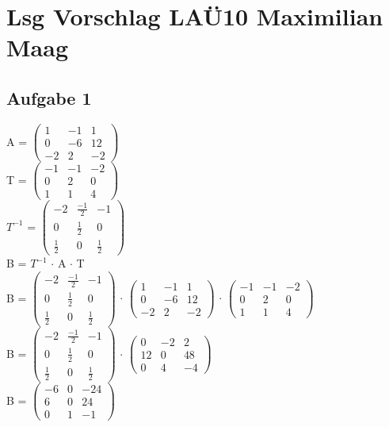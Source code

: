 \documentclass{article}
\begin{document}
	\section*{Lsg Vorschlag LAÜ10 Maximilian Maag}
	\subsection*{Aufgabe 1}
	A = 
	$\left(
	\begin{array}{ccc}
	 1&-1&1 \\ 0&-6&12 \\ -2&2&-2
	\end{array}
	\right)$ \\
	T = 
	$\left(
	\begin{array}{ccc}
	 -1&-1&-2 \\ 0&2&0 \\ 1&1&4
	\end{array}
	\right)$ \\
	$T^{-1}$ =
	$
	\left(\begin{array}{ccc}
	-2 & \frac{-1}{2} & -1 \\
	0 & \frac{1}{2} & 0 \\
	\frac{1}{2} & 0 & \frac{1}{2}
	\end{array}\right)
	$ \\
	B = $T^{-1}$ $\cdot$ A $\cdot$ T \\
	B = 
	$
	\left(\begin{array}{ccc}
	-2 & \frac{-1}{2} & -1 \\
	0 & \frac{1}{2} & 0 \\
	\frac{1}{2} & 0 & \frac{1}{2}
	\end{array}\right)
	$ $\cdot$ 
	$\left(
	\begin{array}{ccc}
	1&-1&1 \\ 0&-6&12 \\ -2&2&-2
	\end{array}
	\right)$
	$\cdot$
	$\left(
	\begin{array}{ccc}
	-1&-1&-2 \\ 0&2&0 \\ 1&1&4
	\end{array}
	\right)$ \\
	B = 
	$
	\left(\begin{array}{ccc}
	-2 & \frac{-1}{2} & -1 \\
	0 & \frac{1}{2} & 0 \\
	\frac{1}{2} & 0 & \frac{1}{2}
	\end{array}\right)
	$
	$\cdot$
	$\left(
	\begin{array}{ccc}
	 0&-2&2 \\ 12&0&48 \\ 0&4&-4
	\end{array}
	\right)$ \\
	B = 
	$
	\left(\begin{array}{ccc}
	-6 & 0 & -24 \\
	6 & 0 & 24 \\
	0 & 1 & -1
	\end{array}\right)
	$
\end{document}
